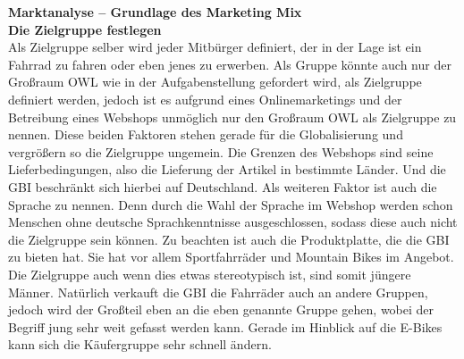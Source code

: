 \textbf{Marktanalyse – Grundlage des Marketing Mix}\\

\small{\textbf{Die Zielgruppe festlegen}}\\
Als Zielgruppe selber wird jeder Mitbürger definiert, der in der Lage ist ein Fahrrad zu fahren oder eben jenes zu erwerben. Als Gruppe könnte auch nur der Großraum OWL wie in der Aufgabenstellung gefordert wird, als Zielgruppe definiert werden, jedoch ist es aufgrund eines Onlinemarketings und der Betreibung eines Webshops unmöglich nur den Großraum OWL als Zielgruppe zu nennen. Diese beiden Faktoren stehen gerade für die Globalisierung und vergrößern so die Zielgruppe ungemein. Die Grenzen des Webshops sind seine Lieferbedingungen, also die Lieferung der Artikel in bestimmte Länder. Und die GBI beschränkt sich hierbei auf Deutschland. Als weiteren Faktor ist auch die Sprache zu nennen. Denn durch die Wahl der Sprache im Webshop werden schon Menschen ohne deutsche Sprachkenntnisse ausgeschlossen, sodass diese auch nicht die Zielgruppe sein können.
Zu beachten ist auch die Produktplatte, die die GBI zu bieten hat. Sie hat vor allem Sportfahrräder und Mountain Bikes im Angebot. Die Zielgruppe auch wenn dies etwas stereotypisch ist, sind somit jüngere Männer. Natürlich verkauft die GBI die Fahrräder auch an andere Gruppen, jedoch wird der Großteil eben an die eben genannte Gruppe gehen, wobei der Begriff jung sehr weit gefasst werden kann. Gerade im Hinblick auf die E-Bikes kann sich die Käufergruppe sehr schnell ändern.\\

